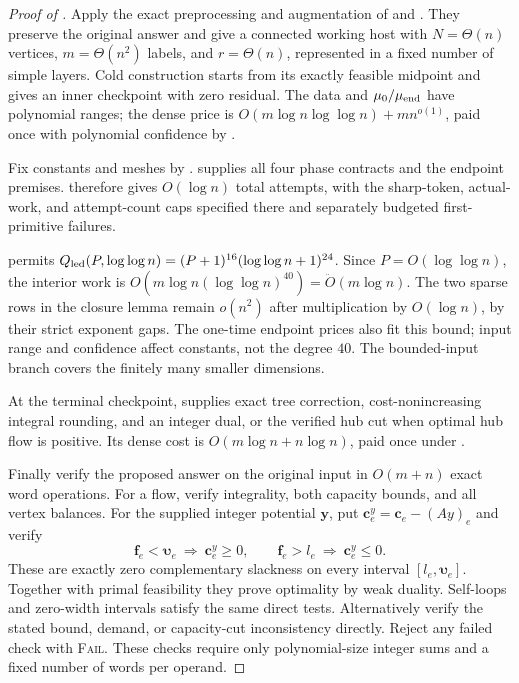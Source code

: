 \documentclass[11pt]{article}
\theoremstyle{remark}
\newcommand{\cc}{\mathbf c}
\newcommand{\ff}{\mathbf f}
\newcommand{\yy}{\mathbf y}
\newcommand{\vvu}{\boldsymbol{\upsilon}}
\renewcommand{\O}{\ddot{O}}
\begin{document}
\begin{proof}[Proof of ]
Apply the exact preprocessing and augmentation of  and
.
They preserve the original answer and give a connected working host with
$N=\Theta(n)$ vertices, $m=\Theta(n^2)$ labels, and $r=\Theta(n)$, represented
in a fixed number of simple layers.
Cold construction starts from its exactly feasible midpoint and gives an inner
checkpoint with zero residual.
The data and $\mu_0/\mu_{\rm end}$ have polynomial ranges; the dense price is
$O(m\log n\log\log n)+mn^{o(1)}$, paid once with polynomial confidence by
.

Fix constants and meshes by .
 supplies all four phase contracts and the
endpoint premises.
 therefore gives $O(\log n)$ total attempts, with the
sharp-token, actual-work, and attempt-count caps specified there and separately
budgeted first-primitive failures.

 permits $Q_{\rm led}(P,\log\log n)=(P+1)^{16}(\log\log n+1)^{24}$.
Since $P=O(\log\log n)$, the interior work is $O(m\log n(\log\log n)^{40})=\O(m\log n)$.
The two sparse rows in the closure lemma remain $o(n^2)$ after multiplication by
$O(\log n)$, by their strict exponent gaps.
The one-time endpoint prices also fit this bound; input range and confidence
affect constants, not the degree $40$.
The bounded-input branch covers the finitely many smaller dimensions.

At the terminal checkpoint,  supplies exact tree
correction, cost-nonincreasing integral rounding, and an integer dual, or the
verified hub cut when optimal hub flow is positive.
Its dense cost is $O(m\log n+n\log n)$, paid once under .

Finally verify the proposed answer on the original input in $O(m+n)$ exact word
operations.
For a flow, verify integrality, both capacity bounds, and all vertex balances.
For the supplied integer potential $\yy$, put $\cc_e^y=\cc_e-(Ay)_e$ and verify
\[
 \ff_e<\vvu_e\ \Longrightarrow\ \cc_e^y\ge0,
 \qquad
 \ff_e>l_e\ \Longrightarrow\ \cc_e^y\le0.
\]
These are exactly zero complementary slackness on every interval $[l_e,\vvu_e]$.
Together with primal feasibility they prove optimality by weak duality.
Self-loops and zero-width intervals satisfy the same direct tests.
Alternatively verify the stated bound, demand, or capacity-cut inconsistency
directly.
Reject any failed check with \textsc{Fail}.
These checks require only polynomial-size integer sums and a fixed number of
words per operand.


\end{proof}
\end{document}
